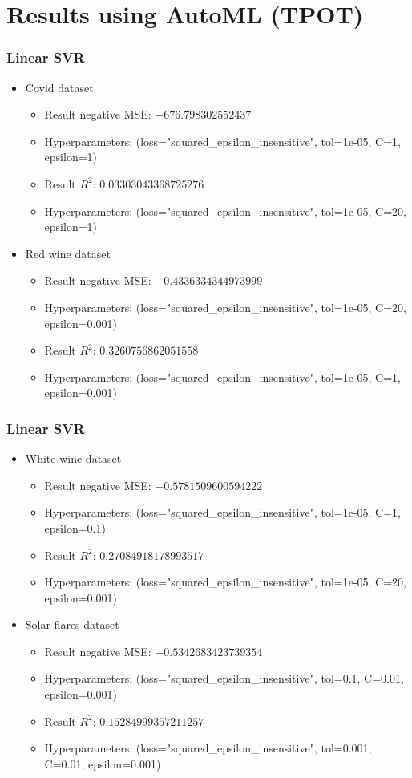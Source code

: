 \documentclass{beamer}
\begin{document}
\section{Results using AutoML (TPOT)}
\frame
{
  \frametitle{Linear SVR}

  \begin{itemize}
    \item Covid dataset
    \begin{itemize}
      \item Result negative MSE: $-676.798302552437$
      \item Hyperparameters: (loss="squared\_epsilon\_insensitive", tol=1e-05, C=1, epsilon=1)
      \item Result $R^{2}$: $0.03303043368725276$
      \item Hyperparameters: (loss="squared\_epsilon\_insensitive", tol=1e-05, C=20, epsilon=1)
    \end{itemize}
    \item Red wine dataset
    \begin{itemize}
      \item Result negative MSE: $-0.4336334344973999$
      \item Hyperparameters: (loss="squared\_epsilon\_insensitive", tol=1e-05, C=20, epsilon=0.001)
      \item Result $R^{2}$: $0.3260756862051558$
      \item Hyperparameters: (loss="squared\_epsilon\_insensitive", tol=1e-05, C=1, epsilon=0.001)
    \end{itemize}
  \end{itemize}
}

\frame
{
  \frametitle{Linear SVR}

  \begin{itemize}
    \item White wine dataset
    \begin{itemize}
      \item Result negative MSE: $-0.5781509600594222$
      \item Hyperparameters: (loss="squared\_epsilon\_insensitive", tol=1e-05, C=1, epsilon=0.1)
      \item Result $R^{2}$: $0.27084918178993517$
      \item Hyperparameters: (loss="squared\_epsilon\_insensitive", tol=1e-05, C=20, epsilon=0.001)
    \end{itemize}
    \item Solar flares dataset
    \begin{itemize}
      \item Result negative MSE: $-0.5342683423739354$
      \item Hyperparameters: (loss="squared\_epsilon\_insensitive", tol=0.1, C=0.01, epsilon=0.001)
      \item Result $R^{2}$: $0.15284999357211257$
      \item Hyperparameters: (loss="squared\_epsilon\_insensitive", tol=0.001, C=0.01, epsilon=0.001)
    \end{itemize}
  \end{itemize}
}
\end{document}
